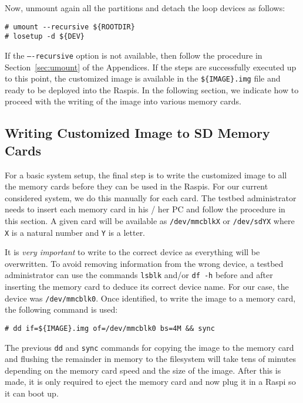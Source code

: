 Now, unmount again all the partitions and detach the loop devices as follows:
\begin{lstlisting}[]
# umount --recursive ${ROOTDIR}
# losetup -d ${DEV}
\end{lstlisting}
\FloatBarrier
\vspace{-5mm}

If the \texttt{----recursive} option is not available, then follow the
procedure in Section~\ref{sec:umount} of the Appendices.
If the steps are successfully executed up to this point, the customized image
is available in the \texttt{\$\{IMAGE\}.img} file and ready to be deployed
into the \ac{Raspi}s. In the following section, we indicate how to proceed
with the writing of the image into various memory cards.

\subsection{Writing Customized Image to SD Memory Cards}
For a basic system setup, the final step is to write the customized image
to all the memory cards before they can be used in the \ac{Raspi}s. For
our current considered system, we do this manually for each card.
The testbed administrator needs to insert each memory card in his / her \ac{PC}
and follow the procedure in this section. A given card will be available as
\texttt{/dev/mmcblkX} or \texttt{/dev/sdYX} where \texttt{X} is a natural number
and \texttt{Y} is a letter.

It is \textit{very important} to write to the correct device as
everything will be overwritten. To avoid removing information from the
wrong device, a testbed administrator can use the commands \texttt{lsblk}
and/or \texttt{df -h} before and after inserting the memory card to deduce
its correct device name.
For our case, the device was \texttt{/dev/mmcblk0}. Once identified, to write
the image to a memory card, the following command is used:

\begin{lstlisting}[]
# dd if=${IMAGE}.img of=/dev/mmcblk0 bs=4M && sync
\end{lstlisting}
\FloatBarrier
\vspace{-5mm}

The previous \texttt{dd} and \texttt{sync} commands for copying the image to
the memory card and flushing the remainder in memory to the filesystem
will take tens of minutes depending on the memory card speed and the size of
the image. After this is made, it is only required
to eject the memory card and now plug it in a \ac{Raspi} so it can boot up.

